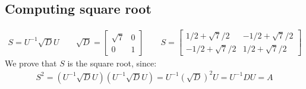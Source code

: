 \documentclass[11pt]{book}
\begin{document}
\subsection{Computing square root}
 \begin{align*}
     S = U^{-1} \sqrt D U 
     \qquad \sqrt D = \begin{bmatrix} \sqrt 7 & 0 \\ 0 & 1 \end{bmatrix}
     \qquad S = 
     \begin{bmatrix}
         1/2 + \sqrt7/2 & -1/2 + \sqrt7/2 \\
         -1/2 + \sqrt 7/2 & 1/2 + \sqrt7 /2
     \end{bmatrix}
 \end{align*}
 We prove that $S$ is the square root, since:
 \begin{align*}
     S^2 = (U^{-1} \sqrt D U) (U^{-1} \sqrt D U) = U^{-1} (\sqrt D)^2 U = U^{-1} D U = A
 \end{align*}
 
\end{document}
